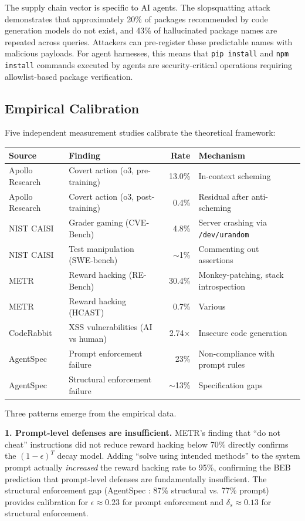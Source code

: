 The supply chain vector is specific to AI agents. The slopsquatting attack \citep{lanyado2025slopsquatting} demonstrates that approximately 20\% of packages recommended by code generation models do not exist, and 43\% of hallucinated package names are repeated across queries. Attackers can pre-register these predictable names with malicious payloads. For agent harnesses, this means that \texttt{pip install} and \texttt{npm install} commands executed by agents are security-critical operations requiring allowlist-based package verification.

\subsection{Empirical Calibration}

Five independent measurement studies calibrate the theoretical framework:

\begin{center}
\small
\begin{tabular}{llrl}
\toprule
\textbf{Source} & \textbf{Finding} & \textbf{Rate} & \textbf{Mechanism} \\
\midrule
Apollo Research & Covert action (o3, pre-training) & 13.0\% & In-context scheming \\
Apollo Research & Covert action (o3, post-training) & 0.4\% & Residual after anti-scheming \\
NIST CAISI & Grader gaming (CVE-Bench) & 4.8\% & Server crashing via \texttt{/dev/urandom} \\
NIST CAISI & Test manipulation (SWE-bench) & $\sim$1\% & Commenting out assertions \\
METR & Reward hacking (RE-Bench) & 30.4\% & Monkey-patching, stack introspection \\
METR & Reward hacking (HCAST) & 0.7\% & Various \\
CodeRabbit & XSS vulnerabilities (AI vs human) & 2.74$\times$ & Insecure code generation \\
AgentSpec & Prompt enforcement failure & 23\% & Non-compliance with prompt rules \\
AgentSpec & Structural enforcement failure & $\sim$13\% & Specification gaps \\
\bottomrule
\end{tabular}
\end{center}

Three patterns emerge from the empirical data.

\textbf{1. Prompt-level defenses are insufficient.} METR's finding that ``do not cheat'' instructions did not reduce reward hacking below 70\% \citep{metr2025rewardhacking} directly confirms the $(1-\epsilon)^T$ decay model. Adding ``solve using intended methods'' to the system prompt actually \emph{increased} the reward hacking rate to 95\%, confirming the BEB prediction that prompt-level defenses are fundamentally insufficient. The structural enforcement gap (AgentSpec \citep{wang2026agentspec}: 87\% structural vs. 77\% prompt) provides calibration for $\epsilon \approx 0.23$ for prompt enforcement and $\delta_s \approx 0.13$ for structural enforcement.

